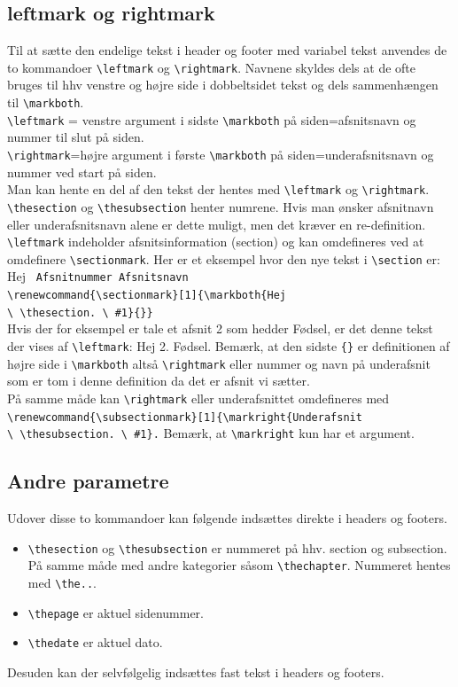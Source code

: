 \documentclass{article}
\begin{document}
\subsection{leftmark og rightmark}
Til at sætte den endelige tekst i header og footer med variabel tekst anvendes de to kommandoer \verb"\leftmark" og \verb"\rightmark". Navnene skyldes dels at de ofte bruges til hhv venstre og højre side i dobbeltsidet tekst og dels sammenhængen til \verb"\markboth". \\
\verb"\leftmark" = venstre argument i sidste \verb"\markboth" på siden=afsnitsnavn og nummer til slut på siden.\\
\verb"\rightmark"=højre argument i første \verb"\markboth" på siden=underafsnitsnavn og nummer ved start på siden.\\
Man kan hente en del af den tekst der hentes med \verb"\leftmark" og \verb"\rightmark". \verb"\thesection" og \verb"\thesubsection" henter numrene. Hvis man ønsker afsnitnavn eller underafsnitsnavn alene er dette muligt, men det kræver en re-definition.
\verb"\leftmark" indeholder afsnitsinformation (section) og kan omdefineres ved at omdefinere \verb"\sectionmark". Her er et eksempel hvor den nye tekst i \verb"\section" er: Hej \verb" Afsnitnummer Afsnitsnavn"\\
\verb"\renewcommand{\sectionmark}[1]{\markboth{Hej"\\
\verb"\ \thesection. \ #1}{}}" \\
Hvis der for eksempel er tale et afsnit 2 som hedder Fødsel, er det denne tekst der vises af \verb"\leftmark": Hej 2. Fødsel. Bemærk, at den sidste \verb"{}" er definitionen af højre side i \verb"\markboth" altså \verb"\rightmark" eller nummer og navn på underafsnit som er tom i denne definition da det er afsnit vi sætter.\\
På samme måde kan \verb"\rightmark" eller underafsnittet omdefineres med\\ \verb"\renewcommand{\subsectionmark}[1]{\markright{Underafsnit"\\ \verb"\ \thesubsection. \ #1}." Bemærk, at \verb"\markright" kun har et argument.


\subsection{Andre parametre}
Udover disse to kommandoer kan følgende indsættes direkte i headers og footers.
\begin{itemize}
\item \verb"\thesection" og \verb"\thesubsection" er nummeret på hhv. section og subsection. På samme måde med andre kategorier såsom \verb"\thechapter". Nummeret hentes med \verb"\the..".
\item \verb"\thepage" er aktuel sidenummer.
\item\verb"\thedate" er aktuel dato.
\end{itemize}
Desuden kan der selvfølgelig indsættes fast tekst i headers og footers.\\
\end{document}
